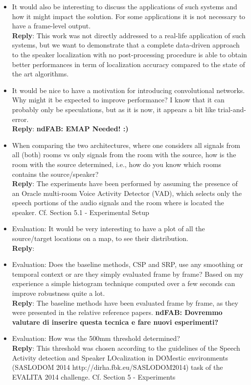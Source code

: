 \documentclass[11pt, technote, letterpaper, oneside, onecolumn]{IEEEtran}
\begin{document}
\begin{itemize}
\item It would also be interesting to discuss the applications of such systems and how it might impact the solution. For some applications it is not necessary to have a frame-level output.\\
\textbf{Reply}: This work was not directly addressed to a real-life application of such systems, but we want to demonstrate that a complete data-driven approach to the speaker localization with no post-processing procedure is able to obtain better performances in term of localization accuracy compared to the state of the art algorithms.

\item It would be nice to have a motivation for introducing convolutional networks. Why might it be expected to improve performance? I know that it can probably only be speculations, but as it is now, it appears a bit like trial-and-error.\\
\textbf{Reply}: \textbf{ndFAB: EMAP Needed! :)}

\item When comparing the two architectures, where one considers all signals from all (both) rooms vs only signals from the room with the source, how is the room with the source determined, i.e., how do you know which rooms contains the source/speaker?\\
\textbf{Reply}: The experiments have been performed by assuming the presence of an Oracle multi-room Voice Activity Detector (VAD), which selects only the speech portions of the audio signals and the room where is located the speaker. Cf. Section 5.1 - Experimental Setup

\item Evaluation: It would be very interesting to have a plot of all the source/target locations on a map, to see their distribution.\\
\textbf{Reply}:

\item Evaluation: Does the baseline methods, CSP and SRP, use any smoothing or temporal context or are they simply evaluated frame by frame? Based on my experience a simple histogram technique computed over a few seconds can improve robustness quite a lot.\\
\textbf{Reply}: The baseline methods have been evaluated frame by frame, as they were presented in the relative reference papers. \textbf{ndFAB: Dovremmo valutare di inserire questa tecnica e fare nuovi esperimenti?}

\item Evaluation: How was the 500mm threshold determined?\\
\textbf{Reply}: This threshold was chosen according to the guidelines of the Speech Activity detection and Speaker LOcalization in DOMestic environments (SASLODOM 2014 http://dirha.fbk.eu/SASLODOM2014) task of the EVALITA 2014 challenge. Cf. Section 5 - Experiments


\end{itemize}
\end{document}
